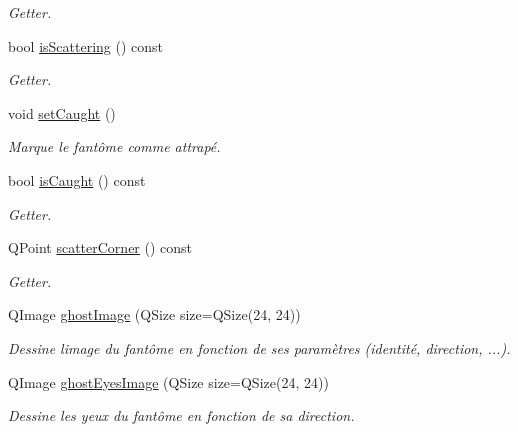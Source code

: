 \begin{DoxyCompactItemize}
\begin{DoxyCompactList}\small\item\em Getter. \end{DoxyCompactList}\item 
bool \hyperlink{class_ghost_aee8ff34fc61b92cc86274fa2b967e814}{is\+Scattering} () const 
\begin{DoxyCompactList}\small\item\em Getter. \end{DoxyCompactList}\item 
\hypertarget{class_ghost_af5702aa6b5aec6edfa9f00843eacd3bb}{}void \hyperlink{class_ghost_af5702aa6b5aec6edfa9f00843eacd3bb}{set\+Caught} ()\label{class_ghost_af5702aa6b5aec6edfa9f00843eacd3bb}

\begin{DoxyCompactList}\small\item\em Marque le fantôme comme attrapé. \end{DoxyCompactList}\item 
bool \hyperlink{class_ghost_adb8eaa0f4a713181fd91f758b7862394}{is\+Caught} () const 
\begin{DoxyCompactList}\small\item\em Getter. \end{DoxyCompactList}\item 
Q\+Point \hyperlink{class_ghost_af538955b257089ee1ab73bcc061b503e}{scatter\+Corner} () const 
\begin{DoxyCompactList}\small\item\em Getter. \end{DoxyCompactList}\item 
Q\+Image \hyperlink{class_ghost_a4856be59d881a5f39657c837d3ceba2c}{ghost\+Image} (Q\+Size size=Q\+Size(24, 24))
\begin{DoxyCompactList}\small\item\em Dessine l\textquotesingle{}image du fantôme en fonction de ses paramètres (identité, direction, ...). \end{DoxyCompactList}\item 
Q\+Image \hyperlink{class_ghost_a4f22bee60957680cdf68396d8e0c7d69}{ghost\+Eyes\+Image} (Q\+Size size=Q\+Size(24, 24))
\begin{DoxyCompactList}\small\item\em Dessine les yeux du fantôme en fonction de sa direction. \end{DoxyCompactList}\end{DoxyCompactItemize}
